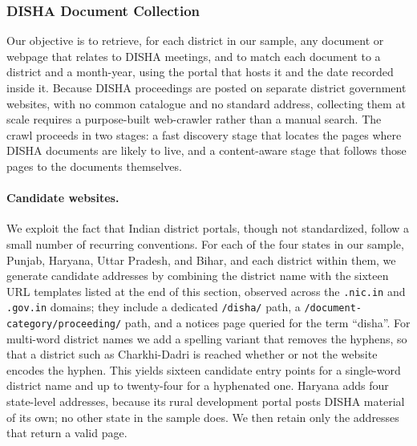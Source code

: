 \documentclass[12pt]{article}
\begin{document}
\subsubsection{DISHA Document Collection}\label{ssec:disha_app}

Our objective is to retrieve, for each district in our sample, any document or webpage that relates to DISHA meetings, and to match each document to a district and a month-year, using the portal that hosts it and the date recorded inside it. Because DISHA proceedings are posted on separate district government websites, with no common catalogue and no standard address, collecting them at scale requires a purpose-built web-crawler rather than a manual search. The crawl proceeds in two stages: a fast discovery stage that locates the pages where DISHA documents are likely to live, and a content-aware stage that follows those pages to the documents themselves.

\paragraph{Candidate websites.} We exploit the fact that Indian district portals, though not standardized, follow a small number of recurring conventions. For each of the four states in our sample, Punjab, Haryana, Uttar Pradesh, and Bihar, and each district within them, we generate candidate addresses by combining the district name with the sixteen URL templates listed at the end of this section, observed across the \texttt{.nic.in} and \texttt{.gov.in} domains; they include a dedicated \texttt{/disha/} path, a \texttt{/document-category/proceeding/} path, and a notices page queried for the term ``disha''. For multi-word district names we add a spelling variant that removes the hyphens, so that a district such as Charkhi-Dadri is reached whether or not the website encodes the hyphen. This yields sixteen candidate entry points for a single-word district name and up to twenty-four for a hyphenated one. Haryana adds four state-level addresses, because its rural development portal posts DISHA material of its own; no other state in the sample does. We then retain only the addresses that return a valid page.

\end{document}
